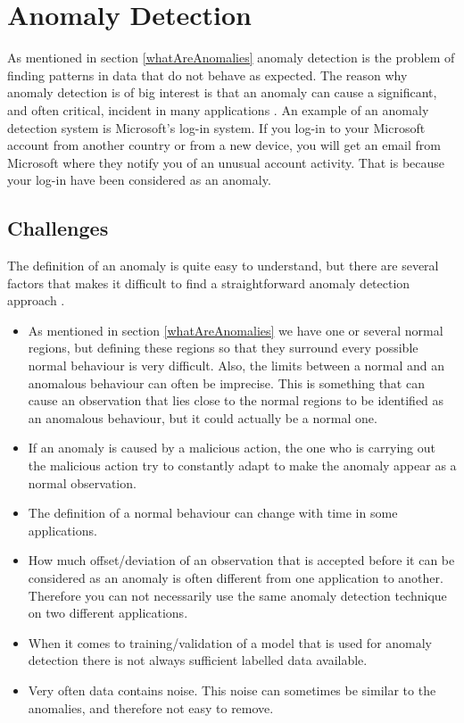 \documentclass[english, a4paper]{report}
\begin{document}
{    \section{Anomaly Detection} \label{anomalyDetection}
    {
        As mentioned in section \ref{whatAreAnomalies} anomaly detection is the problem of finding patterns in data that do not behave as expected. The reason why anomaly detection is of big interest is that an anomaly can cause a significant, and often critical, incident in many applications \cite{anomalyDetection}. An example of an anomaly detection system is Microsoft's log-in system. If you log-in to your Microsoft account from another country or from a new device, you will get an email from Microsoft where they notify you of an unusual account activity. That is because your log-in have been considered as an anomaly. 
        
        \subsection{Challenges} \label{anomDetChallenges}
        {
            The definition of an anomaly is quite easy to understand, but there are several factors that makes it difficult to find a straightforward anomaly detection approach \cite{anomalyDetection}. 
            
            \begin{itemize}
                \item As mentioned in section \ref{whatAreAnomalies} we have one or several normal regions, but defining these regions so that they surround every possible normal behaviour is very difficult. Also, the limits between a normal and an anomalous behaviour can often be imprecise. This is something that can cause an observation that lies close to the normal regions to be identified as an anomalous behaviour, but it could actually be a normal one. 
                \item If an anomaly is caused by a malicious action, the one who is carrying out the malicious action try to constantly adapt to make the anomaly appear as a normal observation. 
                \item The definition of a normal behaviour can change with time in some applications.
                \item How much offset/deviation of an observation that is accepted before it can be considered as an anomaly is often different from one application to another. Therefore you can not necessarily use the same anomaly detection technique on two different applications. 
                \item When it comes to training/validation of a model that is used for anomaly detection there is not always sufficient labelled data available. 
                \item Very often data contains noise. This noise can sometimes be similar to the anomalies, and therefore not easy to remove. 
            \end{itemize}
            
}}}
\end{document}
